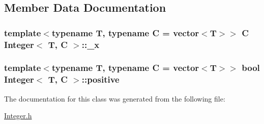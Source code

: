 \subsection{Member Data Documentation}
\hypertarget{classInteger_a19f83aa8d5d86634885eb63d15bcdb6d}{
\subsubsection[{\-\_\-x}]{\setlength{\rightskip}{0pt plus 5cm}template$<$typename T, typename C = vector$<$\-T$>$$>$ C {\bf Integer}$<$ T, C $>$\-::\-\_\-x\hspace{0.3cm}{\ttfamily [private]}}}\label{classInteger_a19f83aa8d5d86634885eb63d15bcdb6d}
\hypertarget{classInteger_af0750e482d739e0d2ebb7185c6b22fc2}{
\subsubsection[{positive}]{\setlength{\rightskip}{0pt plus 5cm}template$<$typename T, typename C = vector$<$\-T$>$$>$ bool {\bf Integer}$<$ T, C $>$\-::positive\hspace{0.3cm}{\ttfamily [private]}}}\label{classInteger_af0750e482d739e0d2ebb7185c6b22fc2}


The documentation for this class was generated from the following file\-:\begin{DoxyCompactItemize}
\item 
\hyperlink{Integer_8h}{Integer.\-h}\end{DoxyCompactItemize}
